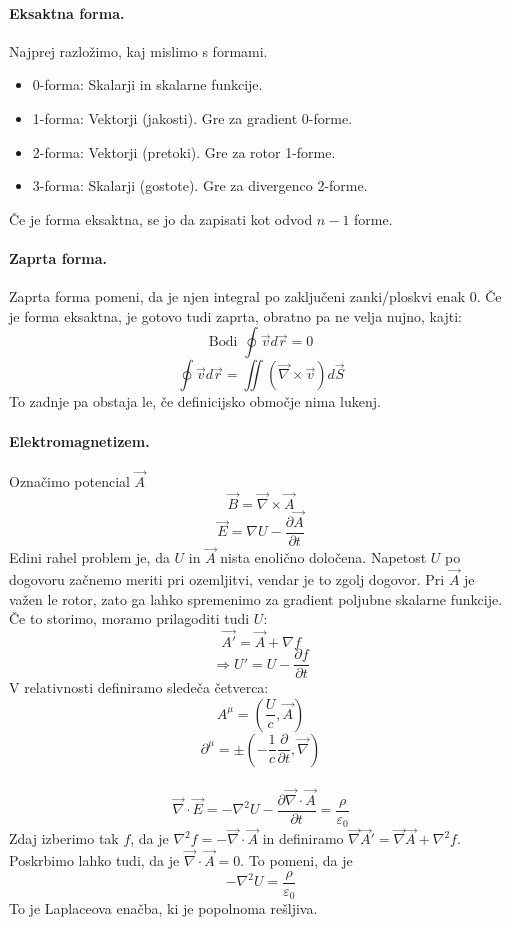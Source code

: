 \documentclass[a4paper]{article}
\newcommand{\vct}[1]{\overrightarrow{#1}}
\newcommand{\pd}[2]{\frac{\partial {#1}}{\partial {#2}}}
\begin{document}
\paragraph{Eksaktna forma.} Najprej razložimo, kaj mislimo s formami.
\begin{itemize}
    \item 0-forma: Skalarji in skalarne funkcije.
    \item 1-forma: Vektorji (jakosti). Gre za gradient 0-forme.
    \item 2-forma: Vektorji (pretoki). Gre za rotor 1-forme.
    \item 3-forma: Skalarji (gostote). Gre za divergenco 2-forme.
\end{itemize}
Če je forma eksaktna, se jo da zapisati kot odvod $n-1$ forme.
\paragraph{Zaprta forma.} Zaprta forma pomeni, da je njen integral po zaključeni zanki/ploskvi enak 0.
Če je forma eksaktna, je gotovo tudi zaprta, obratno pa ne velja nujno, kajti:
$$\text{Bodi } \oint \vct{v} d\vct{r} = 0$$
$$\oint \vct{v} d\vct{r} = \iint (\vct{\nabla}\times\vct{v})d\vct{S}$$
To zadnje pa obstaja le, če definicijsko območje nima lukenj.
\paragraph{Elektromagnetizem.} Označimo potencial $\vct{A}$
$$\vct{B} = \vct{\nabla}\times\vct{A}$$
$$\vct{E} = \nabla U - \pd{\vct{A}}{t}$$
Edini rahel problem je, da $U$ in $\vct{A}$ nista enolično določena. Napetost $U$ po dogovoru začnemo meriti pri ozemljitvi,
vendar je to zgolj dogovor. Pri $\vct{A}$ je važen le rotor, zato ga lahko spremenimo za gradient poljubne skalarne funkcije. Če to storimo, moramo prilagoditi tudi $U$:
$$\vct{A'} = \vct{A} + \nabla f$$
$$\Rightarrow U' = U - \pd{f}{t}$$
V relativnosti definiramo sledeča četverca:
$$A^\mu = \left(\frac{U}{c}, \vct{A}\right)$$
$$\partial^\mu = \pm\left(-\frac{1}{c}\pd{}{t}, \vct{\nabla}\right)$$
\\
$$\vct\nabla\cdot\vct{E} = -\nabla^2U - \pd{\vct\nabla\cdot\vct{A}}{t} = \frac{\rho}{\varepsilon_0}$$
Zdaj izberimo tak $f$, da je $\nabla^2f = -\vct\nabla\cdot\vct{A}$ in definiramo $\vct\nabla\vct{A}' = \vct\nabla\vct{A} + \nabla^2f$. Poskrbimo lahko tudi, da je $\vct\nabla\cdot\vct{A} = 0$. To pomeni, da je
$$-\nabla^2U = \frac{\rho}{\varepsilon_0}$$
To je Laplaceova enačba, ki je popolnoma rešljiva.
\end{document}
